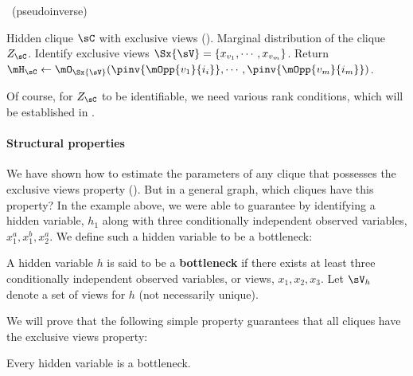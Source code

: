 \renewcommand{\algorithmicrequire}{\textbf{Input:}}
\renewcommand{\algorithmicensure}{\textbf{Output:}}
\begin{algorithm}
  \caption{\LearnClique~(pseudoinverse)}
  \label{algo:learnclique}
  \begin{algorithmic}
    \REQUIRE Hidden clique $\sC$ with exclusive views ().
    \ENSURE Marginal distribution of the clique $Z_\sC$.
      \STATE Identify exclusive views $\Sx{\sV} = \{x_{v_1}, \cdots, x_{v_m}\}$.
      \STATE Return $\mH_\sC \gets \mO_{\Sx{\sV}}( \pinv{\mOpp{v_1}{i_i}}, \cdots, \pinv{\mOpp{v_m}{i_m}} )$.
  \end{algorithmic}
\end{algorithm}
Of course, for $Z_{\sC}$ to be identifiable, we need various rank conditions,
which will be established in .

\paragraph{Structural properties}

We have shown how to estimate the parameters of any clique that possesses the exclusive
  views property (). But in a general graph, which cliques have this property?
In the example above, we were able to guarantee 
  by identifying a hidden variable, $h_1$ along with three conditionally
  independent observed variables, $x^a_1, x^b_1, x^a_2$.
We define such a hidden variable to be a bottleneck:
\begin{definition}[Bottleneck]
  A hidden variable $h$ is said to be a \textbf{bottleneck} if there exists at
    least three conditionally independent observed variables, or views,
    $x_1, x_2, x_3$. 
  Let $\sV_{h}$ denote a set of views for $h$ (not necessarily unique).
\end{definition}

We will prove that the following simple property guarantees that all cliques
have the exclusive views property:
\begin{property}
  \label{prop:bottleneck}
  Every hidden variable is a bottleneck.
\end{property}

